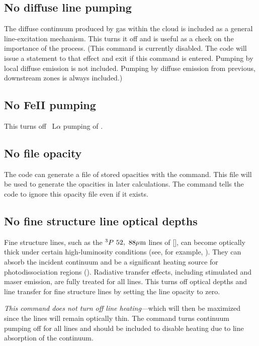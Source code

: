 \subsection{No diffuse line pumping}

The diffuse continuum produced by gas within the cloud is included as
a general line-excitation mechanism.
This turns it off and is useful as
a check on the importance of the process.
(This command is currently disabled. The code will issue 
a statement to that effect and exit if this command
is entered.  Pumping by local diffuse emission
is not included.  Pumping by diffuse emission from previous, downstream
zones is always included.)

\subsection{No FeII pumping}

This turns off \hi\ L$\alpha $ pumping of \feii.

\subsection{No file opacity}

The code can generate a file of stored opacities with the
 command.
This file will be used to generate the opacities in later
calculations.
The  command tells the code to ignore this
opacity file even if it exists.

\subsection{No fine structure line optical depths}

Fine structure lines, such as the $^3P\ 52,\ 88 \micron$ lines of [\oiii],
can become optically thick under certain high-luminosity conditions
(see, for example, \citealp{Rubin1983}).
They can absorb the incident continuum and be a significant
heating source for photodissociation regions
(\citealp{Tielens1985a}).
Radiative transfer effects, including stimulated and maser emission, are
fully treated for all lines.
This turns off optical depths and line transfer
for fine structure lines by setting the line opacity to zero.

\emph{This command does not turn off line heating}---which
will then be maximized
since the lines will remain optically thin.
The  command
turns continuum pumping off for all lines
and should be included to disable heating due to line absorption of the
continuum.

